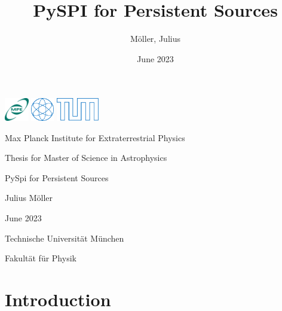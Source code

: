 \documentclass{report}
\title{PySPI for Persistent Sources}
\author{Möller, Julius}
\date{June 2023}
\begin{document}
\begin{titlepage}
    
    \includegraphics[height=1cm]{Images/General/MPE_logo_189x180px.jpg}
    \hfill
    \includegraphics[height=1cm]{Images/General/PH.pdf}
    \includegraphics[height=1cm]{Images/General/tumlogo.pdf}

    \begin{center}
        \vspace{1cm}
        \large

        Max Planck Institute for Extraterrestrial Physics
        

        \vspace{1.5cm}
        \large
        Thesis for Master of Science in Astrophysics
        
        \vspace{3cm}
        \Huge
        PySpi for Persistent Sources
        
        \vspace{3cm}
        
        \LARGE
        Julius Möller
        
        \vspace{1.5cm}
        \large
        June 2023
        
        
        \vspace{6.5cm}
        
        
        
        \large
        Technische Universität München

        Fakultät für Physik
        
        
        
    \end{center}
\end{titlepage}


\tableofcontents

\pagebreak

\chapter{Introduction}
\label{Introduction}
\end{document}
